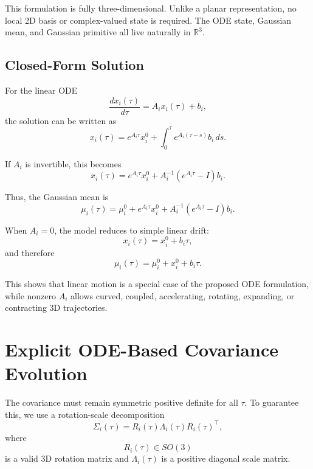 \documentclass[11pt]{article}
\begin{document}
This formulation is fully three-dimensional. Unlike a planar representation, no local 2D basis or complex-valued state is required. The ODE state, Gaussian mean, and Gaussian primitive all live naturally in $\mathbb{R}^3$.

\subsection{Closed-Form Solution}

For the linear ODE
\begin{equation}
\frac{d x_i(\tau)}{d\tau}
=
A_i x_i(\tau)+b_i,
\end{equation}
the solution can be written as
\begin{equation}
x_i(\tau)
=
e^{A_i\tau}x_i^0
+
\int_0^\tau e^{A_i(\tau-s)}b_i\,ds.
\end{equation}

If $A_i$ is invertible, this becomes
\begin{equation}
x_i(\tau)
=
e^{A_i\tau}x_i^0
+
A_i^{-1}\left(e^{A_i\tau}-I\right)b_i.
\end{equation}

Thus, the Gaussian mean is
\begin{equation}
\mu_i(\tau)
=
\mu_i^0
+
e^{A_i\tau}x_i^0
+
A_i^{-1}\left(e^{A_i\tau}-I\right)b_i.
\end{equation}

When $A_i=0$, the model reduces to simple linear drift:
\begin{equation}
x_i(\tau)=x_i^0+b_i\tau,
\end{equation}
and therefore
\begin{equation}
\mu_i(\tau)=\mu_i^0+x_i^0+b_i\tau.
\end{equation}

This shows that linear motion is a special case of the proposed ODE formulation, while nonzero $A_i$ allows curved, coupled, accelerating, rotating, expanding, or contracting 3D trajectories.

\section{Explicit ODE-Based Covariance Evolution}

The covariance must remain symmetric positive definite for all $\tau$. To guarantee this, we use a rotation-scale decomposition
\begin{equation}
\Sigma_i(\tau)
=
R_i(\tau)
\Lambda_i(\tau)
R_i(\tau)^\top,
\end{equation}
where
\begin{equation}
R_i(\tau)\in SO(3)
\end{equation}
is a valid 3D rotation matrix and $\Lambda_i(\tau)$ is a positive diagonal scale matrix.
\end{document}
